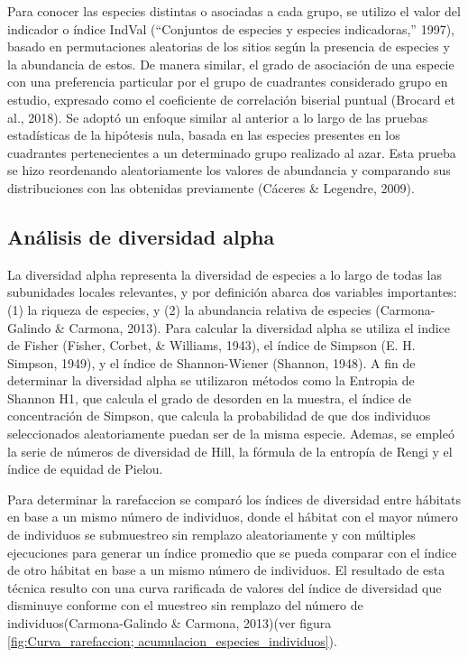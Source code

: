 \documentclass[11pt,]{article}
\begin{document}
Para conocer las especies distintas o asociadas a cada grupo, se utilizo
el valor del indicador o índice IndVal (``Conjuntos de especies y
especies indicadoras,'' 1997), basado en permutaciones aleatorias de los
sitios según la presencia de especies y la abundancia de estos. De
manera similar, el grado de asociación de una especie con una
preferencia particular por el grupo de cuadrantes considerado grupo en
estudio, expresado como el coeficiente de correlación biserial puntual
(Brocard et al., 2018). Se adoptó un enfoque similar al anterior a lo
largo de las pruebas estadísticas de la hipótesis nula, basada en las
especies presentes en los cuadrantes pertenecientes a un determinado
grupo realizado al azar. Esta prueba se hizo reordenando aleatoriamente
los valores de abundancia y comparando sus distribuciones con las
obtenidas previamente (Cáceres \& Legendre, 2009).

\subsection{Análisis de diversidad
alpha}\label{anuxe1lisis-de-diversidad-alpha}

La diversidad alpha representa la diversidad de especies a lo largo de
todas las subunidades locales relevantes, y por definición abarca dos
variables importantes: (1) la riqueza de especies, y (2) la abundancia
relativa de especies (Carmona-Galindo \& Carmona, 2013). Para calcular
la diversidad alpha se utiliza el indice de Fisher (Fisher, Corbet, \&
Williams, 1943), el índice de Simpson (E. H. Simpson, 1949), y el índice
de Shannon-Wiener (Shannon, 1948). A fin de determinar la diversidad
alpha se utilizaron métodos como la Entropia de Shannon H1, que calcula
el grado de desorden en la muestra, el índice de concentración de
Simpson, que calcula la probabilidad de que dos individuos seleccionados
aleatoriamente puedan ser de la misma especie. Ademas, se empleó la
serie de números de diversidad de Hill, la fórmula de la entropía de
Rengi y el índice de equidad de Pielou.

Para determinar la rarefaccion se comparó los índices de diversidad
entre hábitats en base a un mismo número de individuos, donde el hábitat
con el mayor número de individuos se submuestreo sin remplazo
aleatoriamente y con múltiples ejecuciones para generar un índice
promedio que se pueda comparar con el índice de otro hábitat en base a
un mismo número de individuos. El resultado de esta técnica resulto con
una curva rarificada de valores del índice de diversidad que disminuye
conforme con el muestreo sin remplazo del número de
individuos(Carmona-Galindo \& Carmona, 2013)(ver figura
\ref{fig:Curva_rarefaccion; acumulacion_especies_individuos}).
\end{document}
